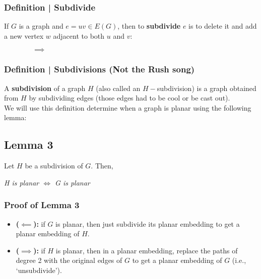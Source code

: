 \documentclass{report}
\begin{document}
\subsubsection{Definition | Subdivide}
If $G$ is a graph and $e = uv \in E(G)$, then to \textbf{subdivide} $e$ is to delete it and add a new vertex $w$ adjacent to both $u$ and $v$:
\begin{center}
$\qquad\qquad \implies \qquad\qquad$
\end{center}
\subsubsection{Definition | Subdivisions (Not the Rush song)}
A \textbf{subdivision} of a graph $H$ (also called an $H-$subdivision) is a graph obtained from $H$ by subdividing edges (those edges had to be cool or be cast out).\\
We will use this definition determine when a graph is planar using the following lemma:
\subsection{Lemma 3}
Let $H$ be a subdivision of $G$. Then,
\begin{center}
\textit{H is planar $\iff$ G is planar}
\end{center}
\subsubsection{Proof of Lemma 3}
\begin{itemize}
\item \textbf{($\impliedby$):} if $G$ is planar, then just subdivide its planar embedding to get a planar embedding of $H$.
\item \textbf{($\implies$):} if $H$ is planar, then in a planar embedding, replace the paths of degree 2 with the original edges of $G$ to get a planar embedding of $G$ (i.e., `unsubdivide').
\end{itemize}
\end{document}
